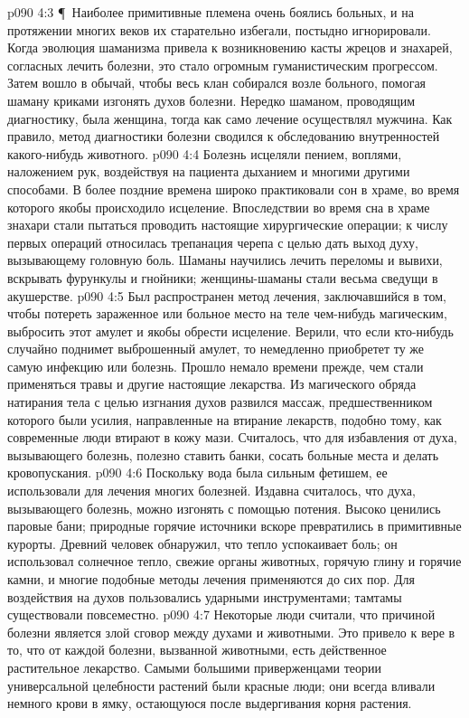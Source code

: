 \vs p090 4:3 \P\ Наиболее примитивные племена очень боялись больных, и на протяжении многих веков их старательно избегали, постыдно игнорировали. Когда эволюция шаманизма привела к возникновению касты жрецов и знахарей, согласных лечить болезни, это стало огромным гуманистическим прогрессом. Затем вошло в обычай, чтобы весь клан собирался возле больного, помогая шаману криками изгонять духов болезни. Нередко шаманом, проводящим диагностику, была женщина, тогда как само лечение осуществлял мужчина. Как правило, метод диагностики болезни сводился к обследованию внутренностей какого\hyp{}нибудь животного.
\vs p090 4:4 Болезнь исцеляли пением, воплями, наложением рук, воздействуя на пациента дыханием и многими другими способами. В более поздние времена широко практиковали сон в храме, во время которого якобы происходило исцеление. Впоследствии во время сна в храме знахари стали пытаться проводить настоящие хирургические операции; к числу первых операций относилась трепанация черепа с целью дать выход духу, вызывающему головную боль. Шаманы научились лечить переломы и вывихи, вскрывать фурункулы и гнойники; женщины\hyp{}шаманы стали весьма сведущи в акушерстве.
\vs p090 4:5 Был распространен метод лечения, заключавшийся в том, чтобы потереть зараженное или больное место на теле чем\hyp{}нибудь магическим, выбросить этот амулет и якобы обрести исцеление. Верили, что если кто\hyp{}нибудь случайно поднимет выброшенный амулет, то немедленно приобретет ту же самую инфекцию или болезнь. Прошло немало времени прежде, чем стали применяться травы и другие настоящие лекарства. Из магического обряда натирания тела с целью изгнания духов развился массаж, предшественником которого были усилия, направленные на втирание лекарств, подобно тому, как современные люди втирают в кожу мази. Считалось, что для избавления от духа, вызывающего болезнь, полезно ставить банки, сосать больные места и делать кровопускания.
\vs p090 4:6 Поскольку вода была сильным фетишем, ее использовали для лечения многих болезней. Издавна считалось, что духа, вызывающего болезнь, можно изгонять с помощью потения. Высоко ценились паровые бани; природные горячие источники вскоре превратились в примитивные курорты. Древний человек обнаружил, что тепло успокаивает боль; он использовал солнечное тепло, свежие органы животных, горячую глину и горячие камни, и многие подобные методы лечения применяются до сих пор. Для воздействия на духов пользовались ударными инструментами; тамтамы существовали повсеместно.
\vs p090 4:7 Некоторые люди считали, что причиной болезни является злой сговор между духами и животными. Это привело к вере в то, что от каждой болезни, вызванной животными, есть действенное растительное лекарство. Самыми большими приверженцами теории универсальной целебности растений были красные люди; они всегда вливали немного крови в ямку, остающуюся после выдергивания корня растения.
